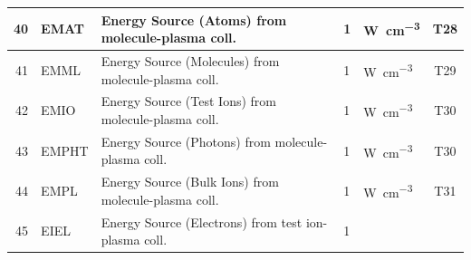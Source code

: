 \begin{landscape}
\begin{longtable}{|r|l|l|l|l|c|}
    \\	\hline
    40                                                             & EMAT
                                                                   & Energy Source (Atoms)
    from molecule-plasma coll.
                                                                   & 1
                                                                   &
    \si{\watt\per\cubic\centi\metre}                               & T28
    \\	\hline
    41                                                             & EMML
                                                                   & Energy Source (Molecules)
    from molecule-plasma coll.
                                                                   & 1
                                                                   &
    \si{\watt\per\cubic\centi\metre}                               & T29
    \\	\hline
    42                                                             & EMIO
                                                                   & Energy Source (Test Ions)
    from molecule-plasma coll.
                                                                   & 1
                                                                   &
    \si{\watt\per\cubic\centi\metre}                               & T30
    \\	 \hline
    43                                                             & EMPHT
                                                                   & Energy Source (Photons)
    from molecule-plasma coll.
                                                                   & 1
                                                                   &
    \si{\watt\per\cubic\centi\metre}                               & T30
    \\	 \hline
    44                                                             & EMPL
                                                                   & Energy Source (Bulk Ions)
    from molecule-plasma coll.
                                                                   & 1
                                                                   &
    \si{\watt\per\cubic\centi\metre}                               & T31
    \\  \hline
    45                                                             & EIEL
                                                                   & Energy Source (Electrons)
    from test ion-plasma coll.
                                                                   & 1

\end{longtable}
\end{landscape}
